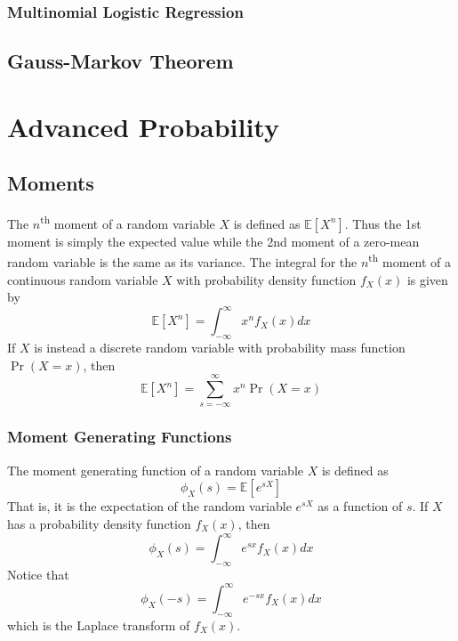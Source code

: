 \documentclass[11pt]{report} %
\begin{document}
\subsection{Multinomial Logistic Regression}

\section{Gauss-Markov Theorem}

\chapter{Advanced Probability}

\section{Moments}

The $n$\textsuperscript{th} moment of a random variable $X$ is defined as $\mathbb{E}\left[X^{n}\right]$. Thus the 1st moment is simply the expected value while the 2nd moment of a zero-mean random variable is the same as its variance. The integral for the $n$\textsuperscript{th} moment of a continuous random variable $X$ with probability density function $f_{X}\left(x\right)$ is given by
\begin{equation}
\mathbb{E}\left[X^{n}\right] = \int_{-\infty}^{\infty}x^{n}f_{X}\left(x\right)dx
\end{equation}
If $X$ is instead a discrete random variable with probability mass function $\operatorname{Pr}\left(X = x\right)$, then
\begin{equation}
\mathbb{E}\left[X^{n}\right] = \sum_{s = -\infty}^{\infty}x^{n}\operatorname{Pr}\left(X = x\right)
\end{equation}

\subsection{Moment Generating Functions}

The moment generating function of a random variable $X$ is defined as
\begin{equation}
\phi_{X}\left(s\right) = \mathbb{E}\left[e^{sX}\right]
\end{equation}
That is, it is the expectation of the random variable $e^{sX}$ as a function of $s$. If $X$ has a probability density function $f_{X}\left(x\right)$, then
\begin{equation}
\phi_{X}\left(s\right) = \int_{-\infty}^{\infty}e^{sx}f_{X}\left(x\right)dx
\end{equation}
Notice that
\begin{equation}
\phi_{X}\left(-s\right) = \int_{-\infty}^{\infty}e^{-sx}f_{X}\left(x\right)dx
\end{equation}
which is the Laplace transform of $f_{X}\left(x\right)$. \\
\end{document}
